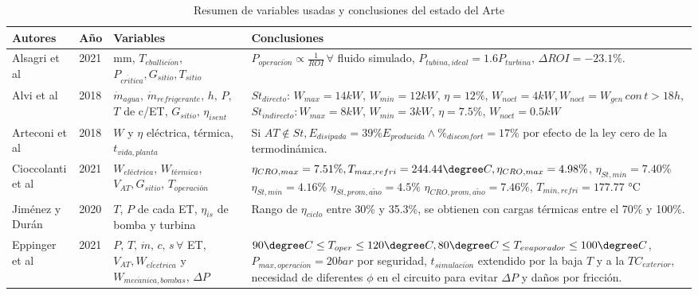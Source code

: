 {\begin{footnotesize}
\pagebreak
\begin{longtable}[H]{p{1.5cm}p{0.5cm}p{4cm}p{9.3cm}}
    \caption{Resumen de variables usadas y conclusiones del estado del Arte}
    \label{tab:tabedoarte1} \\
        \hline
        Autores & Año & Variables & Conclusiones\\
        \hline
        Alsagri et al & 2021 & 
        mm, $T_{ebullici\acute{o}n}$, $P_{cr\acute{i}tica}, G_{sitio},T_{sitio}$ &
        $P_{operaci\acute{o}n}\propto \frac{1}{ROI} \, \forall $ fluido simulado, $P_{tubina,ideal}=1.6P_{turbina}, \, \Delta ROI=-23.1\%$. \\
        Alvi et al & 2018 &
        $\dot{m}_{agua}, \, \dot{m}_{refrigerante},\, h, \, P,$ $T$ de c/ET, $G_{sitio},\,\eta_{isent}$ & 
        $St_{directo}: \,W_{max}=14 kW$, $W_{min}=12 kW$, $\eta=12\%$, $W_{noct}=4 kW, W_{noct} = W_{gen} \,con\,t>18h$, $St_{indirecto}: W_{max}=8 kW$, $W_{min}=3 kW$, $\eta=7.5\%$, $W_{noct}=0.5 kW$ \\
        Arteconi et al & 2018 &
        $W$ y $\eta$ eléctrica, térmica, $t_{vida,planta}$ & 
        Si $AT \notin St, E_{disipada}=39\%E_{producida} \land \%_{disconfort}=17\%$ por efecto de la ley cero de la termodinámica. \\
        Cioccolanti et al & 2021 & 
        $W_{eléctrica}$, $W_{térmica}$, $V_{AT}, G_{sitio}$, $T_{operación}$ &
        $\eta_{CRO,max}=7.51\%, T_{max,refri}=244.44 \degree C, \eta_{CRO,max}=4.98\%$, $\eta_{St,min}=7.40\%$ $\eta_{St,min}=4.16\%$ $\eta_{St,prom,a\tilde{n}o}=4.5\%$ $\eta_{CRO,prom,a\tilde{n}o}=7.46\%$, $T_{min,refri}=177.77$ °C \\
        Jiménez y Durán & 2020 & 
        $T$, $P$ de cada ET, $\eta_{is}$ de bomba y turbina &
        Rango de $\eta_{ciclo}$ entre 30\% y 35.3\%, se obtienen con cargas térmicas entre el 70\% y 100\%. \\
        Eppinger et al & 2021 &
        $P,\, T, \, \dot{m}, \, c, \, s \, \forall$ ET, $V_{AT}, W_{el\acute{e}ctrica}$ y $W_{mec\acute{a}nica,bombas}$, $\Delta P$ &
        $90 \degree C \leq T_{oper} \leq 120 \degree C, 80 \degree C \leq T_{evaporador} \leq 100 \degree C$, $P_{max,operaci\acute{o}n}=20 bar$ por seguridad, $t_{simulaci\acute{o}n}$ extendido por la baja $T$ y a la $TC_{exterior}$, necesidad de diferentes $\phi$ en el circuito para evitar $\Delta P$ y daños por fricción. \\

\end{longtable}
\end{footnotesize}}
